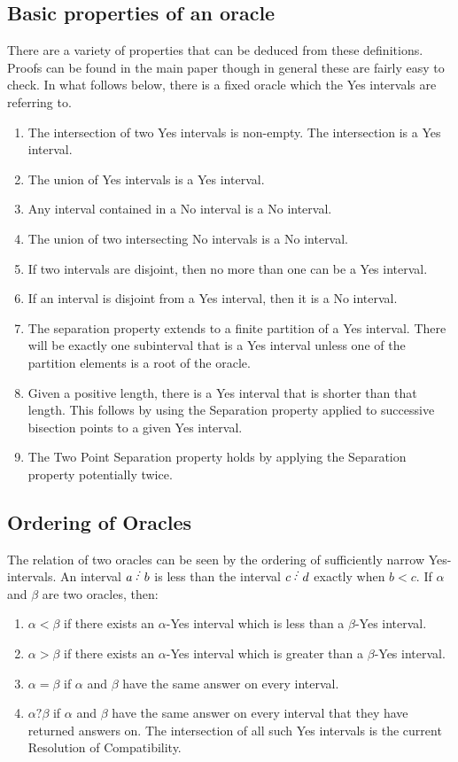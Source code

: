 \documentclass[12pt]{article}
\begin{document}
\subsection{Basic properties of an oracle}

There are a variety of properties that can be deduced from these definitions. Proofs can be found in the main paper though in general these are fairly easy to check. In what follows below, there is a fixed oracle which the Yes intervals are referring to.

\begin{enumerate}
    \item The intersection of two Yes intervals is non-empty. The intersection is a Yes interval. 
    \item The union of Yes intervals is a Yes interval. 
    \item Any interval contained in a No interval is a No interval. 
    \item The union of two intersecting No intervals is a No interval. 
    \item If two intervals are disjoint, then no more than one can be a Yes interval. 
    \item If an interval is disjoint from a Yes interval, then it is a No interval. 
    \item The separation property extends to a finite partition of a Yes interval. There will be exactly one subinterval that is a Yes interval unless one of the partition elements is a root of the oracle.   
    \item Given a positive length, there is a Yes interval that is shorter than that length. This follows by using the Separation property applied to successive bisection points to a given Yes interval.  
    \item The Two Point Separation property holds by applying the Separation property potentially twice. 
\end{enumerate}

\subsection{Ordering of Oracles}

The relation of two oracles can be seen by the ordering of sufficiently narrow Yes-intervals. An interval $a\lte b$ is less than the interval $c\lte d$ exactly when $b < c$. If  $\alpha$ and  $\beta$ are two oracles, then:
\begin{enumerate}
\item $\alpha<\beta$ if there exists an  $\alpha$-Yes interval which is less than a  $\beta$-Yes interval.
\item $\alpha>\beta$ if there exists an  $\alpha$-Yes interval which is greater than a  $\beta$-Yes interval.
\item $\alpha=\beta$ if  $\alpha$ and  $\beta$ have the same answer on every interval.
\item $\alpha?\beta$ if  $\alpha$ and  $\beta$ have the same answer on every interval that they have returned answers on. The intersection of all such Yes intervals is the current Resolution of Compatibility. 
\end{enumerate}
\end{document}
